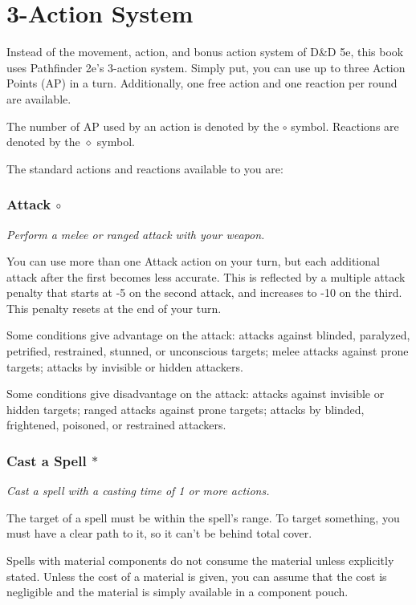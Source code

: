 \section{3-Action System} \label{sec::3actionsystem}

Instead of the movement, action, and bonus action system of D\&D 5e, this book uses Pathfinder 2e's 3-action system.
Simply put, you can use up to three Action Points (AP) in a turn.
Additionally, one free action and one reaction per round are available.

The number of AP used by an action is denoted by the $\circ$ symbol.
Reactions are denoted by the $\diamond$ symbol.

The standard actions and reactions available to you are:

\subsubsection{Attack $\circ$}
    \textit{Perform a melee or ranged attack with your weapon.}

    You can use more than one Attack action on your turn, but each additional attack after the first becomes less accurate.
    This is reflected by a multiple attack penalty that starts at -5 on the second attack, and increases to -10 on the third.
    This penalty resets at the end of your turn.

    Some conditions give advantage on the attack: attacks against blinded, paralyzed, petrified, restrained, stunned, or unconscious targets; melee attacks against prone targets; attacks by invisible or hidden attackers.

    Some conditions give disadvantage on the attack: attacks against invisible or hidden targets; ranged attacks against prone targets; attacks by blinded, frightened, poisoned, or restrained attackers.

\subsubsection{Cast a Spell $\ast$}
    \textit{Cast a spell with a casting time of 1 or more actions.}

    The target of a spell must be within the spell's range.
    To target something, you must have a clear path to it, so it can't be behind total cover.

    Spells with material components do not consume the material unless explicitly stated.
    Unless the cost of a material is given, you can assume that the cost is negligible and the material is simply available in a component pouch.

